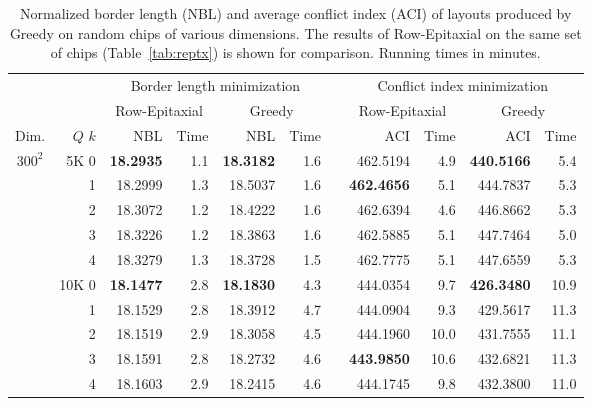 \begin{table}[p!]\centering
\caption{\label{tab:greedy}
  Normalized border length (NBL) and average conflict index (ACI) of layouts
  produced by Greedy on random chips of various dimensions. The results of
  Row-Epitaxial on the same set of chips (Table~\ref{tab:reptx}) is shown for
  comparison. Running times in minutes.}
\footnotesize{
\begin{tabular*}{\hsize}{crrrrrlrrrr}
\vspace{1pt}
     &         & \multicolumn{4}{c}{Border length minimization} & & \multicolumn{4}{c}{Conflict index minimization} \\ \cline{3-6} \cline{8-11}
\vspace{1pt}
     &         & \multicolumn{2}{c}{Row-Epitaxial} & \multicolumn{2}{c}{Greedy} & & \multicolumn{2}{c}{Row-Epitaxial} & \multicolumn{2}{c}{Greedy} \\
\vspace{1pt}
Dim. & $Q$ $k$ & NBL & Time & NBL & Time & & ACI & Time & ACI & Time \\
\hline
$300^2$ &  5K 0 & {\bf 18.2935} &  1.1 & {\bf 18.3182} &  1.6 &  &      462.5194  &   4.9 & {\bf 440.5166} &   5.4 \\
        &     1 &      18.2999  &  1.3 &      18.5037  &  1.6 &  & {\bf 462.4656} &   5.1 &      444.7837  &   5.3 \\
        &     2 &      18.3072  &  1.2 &      18.4222  &  1.6 &  &      462.6394  &   4.6 &      446.8662  &   5.3 \\
        &     3 &      18.3226  &  1.2 &      18.3863  &  1.6 &  &      462.5885  &   5.1 &      447.7464  &   5.0 \\
        &     4 &      18.3279  &  1.3 &      18.3728  &  1.5 &  &      462.7775  &   5.1 &      447.6559  &   5.3 \\
\cline{2-11}
        & 10K 0 & {\bf 18.1477} &  2.8 & {\bf 18.1830} &  4.3 &  &      444.0354  &   9.7 & {\bf 426.3480} &  10.9 \\
        &     1 &      18.1529  &  2.8 &      18.3912  &  4.7 &  &      444.0904  &   9.3 &      429.5617  &  11.3 \\
        &     2 &      18.1519  &  2.9 &      18.3058  &  4.5 &  &      444.1960  &  10.0 &      431.7555  &  11.1 \\
        &     3 &      18.1591  &  2.8 &      18.2732  &  4.6 &  & {\bf 443.9850} &  10.6 &      432.6821  &  11.3 \\
        &     4 &      18.1603  &  2.9 &      18.2415  &  4.6 &  &      444.1745  &   9.8 &      432.3800  &  11.0 \\

\end{tabular*}}
\end{table}
